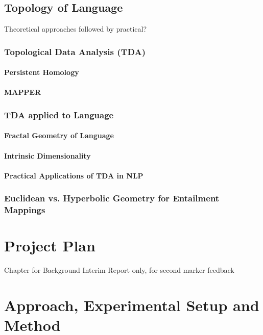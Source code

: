\documentclass[12pt,twoside]{report}
\begin{document}
\section{Topology of Language}
Theoretical approaches followed by  practical?
\subsection{Topological Data Analysis (TDA)}
\subsubsection{Persistent Homology}
\subsubsection{MAPPER}
\subsection{TDA applied to Language}
\subsubsection{Fractal Geometry of Language}
\subsubsection{Intrinsic Dimensionality}
\subsubsection{Practical Applications of TDA in NLP}
\subsection{Euclidean vs. Hyperbolic Geometry for Entailment Mappings}



\chapter{Project Plan}
Chapter for Background Interim Report only, for second marker feedback




\chapter{Approach, 
Experimental Setup and Method}
\end{document}
